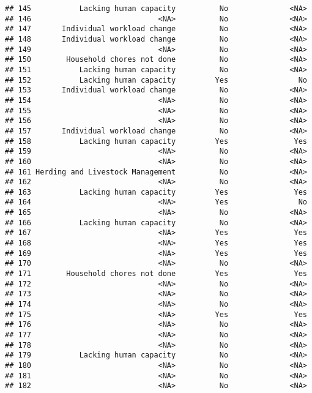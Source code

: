 \documentclass[
]{article}
\begin{document}
\begin{verbatim}
## 145           Lacking human capacity          No              <NA>
## 146                             <NA>          No              <NA>
## 147       Individual workload change          No              <NA>
## 148       Individual workload change          No              <NA>
## 149                             <NA>          No              <NA>
## 150        Household chores not done          No              <NA>
## 151           Lacking human capacity          No              <NA>
## 152           Lacking human capacity         Yes                No
## 153       Individual workload change          No              <NA>
## 154                             <NA>          No              <NA>
## 155                             <NA>          No              <NA>
## 156                             <NA>          No              <NA>
## 157       Individual workload change          No              <NA>
## 158           Lacking human capacity         Yes               Yes
## 159                             <NA>          No              <NA>
## 160                             <NA>          No              <NA>
## 161 Herding and Livestock Management          No              <NA>
## 162                             <NA>          No              <NA>
## 163           Lacking human capacity         Yes               Yes
## 164                             <NA>         Yes                No
## 165                             <NA>          No              <NA>
## 166           Lacking human capacity          No              <NA>
## 167                             <NA>         Yes               Yes
## 168                             <NA>         Yes               Yes
## 169                             <NA>         Yes               Yes
## 170                             <NA>          No              <NA>
## 171        Household chores not done         Yes               Yes
## 172                             <NA>          No              <NA>
## 173                             <NA>          No              <NA>
## 174                             <NA>          No              <NA>
## 175                             <NA>         Yes               Yes
## 176                             <NA>          No              <NA>
## 177                             <NA>          No              <NA>
## 178                             <NA>          No              <NA>
## 179           Lacking human capacity          No              <NA>
## 180                             <NA>          No              <NA>
## 181                             <NA>          No              <NA>
## 182                             <NA>          No              <NA>

\end{verbatim}
\end{document}
